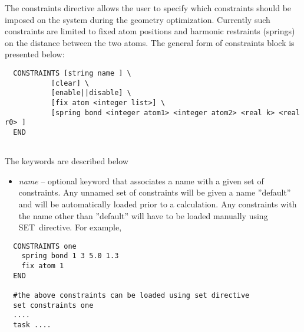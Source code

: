 \label{sec:constraintsnew}

The constraints directive  allows the user to specify which constraints
should be imposed on the system during the geometry optimization. Currently
such constraints are limited to fixed atom positions and 
harmonic restraints (springs) on the distance between the two atoms. The
general form of constraints block is presented below: 
\begin{verbatim}
  CONSTRAINTS [string name ] \
           [clear] \
           [enable||disable] \
           [fix atom <integer list>] \
           [spring bond <integer atom1> <integer atom2> <real k> <real r0> ]
  END
          
\end{verbatim}
The keywords are described below 
\begin{itemize}
\item {\it name} -- optional keyword that associates a name with a given set of
constraints. Any unnamed set of constraints will be given a name ''default''
and will be automatically loaded prior to a calculation. Any constraints
with the name other than ''default''  will have to be loaded manually using
SET\ directive. For example,
\end{itemize}

\begin{verbatim}
  CONSTRAINTS one
    spring bond 1 3 5.0 1.3
    fix atom 1
  END
   
  #the above constraints can be loaded using set directive
  set constraints one
  ....
  task ....
\end{verbatim}

